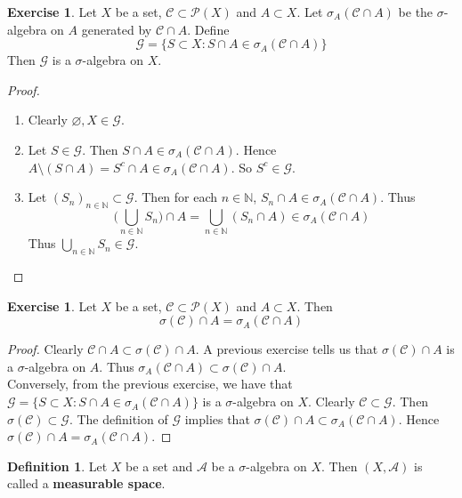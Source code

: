 \documentclass[12pt]{amsart}
\theoremstyle{definition}
\newtheorem{defn}[definition]{Definition}
\newtheorem{ex}[definition]{Exercise}
\newcommand{\sig}{\sigma}
\newcommand{\N}{\mathbb{N}}
\newcommand{\MA}{\mathcal{A}}
\newcommand{\MC}{\mathcal{C}}
\newcommand{\MG}{\mathcal{G}}
\newcommand{\MP}{\mathcal{P}}
\begin{document}
	\begin{ex}
		Let $X$ be a set, $\MC \subset \MP(X)$ and $A \subset X$. Let $\sig_A(\MC \cap A)$ be the $\sig$-algebra on $A$ generated by $\MC \cap A$. Define $$\MG = \{S \subset X: S \cap A \in \sig_A(\MC \cap A)\}$$ 
		Then $\MG$ is a $\sig$-algebra on $X$. 
	\end{ex}
	
	\begin{proof}
		\begin{enumerate}
			\item Clearly $\varnothing, X \in \MG$. 
			\item Let $S \in \MG$. Then $S \cap A \in \sig_A(\MC \cap A)$. Hence $A \setminus (S \cap A)  = S^c \cap A \in \sig_A(\MC \cap A)$. So $S^c \in \MG$. 
			\item Let $(S_n)_{n \in \N} \subset \MG$. Then for each $n \in \N$, $S_n \cap A \in \sig_A(\MC \cap A)$. Thus $$\bigg( \bigcup_{n \in \N} S_n \bigg) \cap A = \bigcup\limits_{n \in \N}(S_n \cap A) \in \sig_A(\MC \cap A)$$ Thus $\bigcup\limits_{n \in \N} S_n \in \MG$.
		\end{enumerate}
	\end{proof}
	
	\begin{ex}
		Let $X$ be a set, $\MC \subset \MP(X)$ and $A \subset X$. Then $$\sig(\MC) \cap A = \sig_A(\MC \cap A)$$
	\end{ex}
	
	\begin{proof}
		Clearly $\MC \cap A \subset \sig(\MC) \cap A$. A previous exercise tells us that $\sig(\MC) \cap A$ is a $\sig$-algebra on $A$. Thus $\sig_A(\MC \cap A) \subset \sig(\MC) \cap A$. \vspace{3mm}\\ Conversely, from the previous exercise, we have that $\MG = \{S \subset X: S \cap A \in \sig_A(\MC \cap A)\}$ is a $\sig$-algebra on $X$. Clearly $\MC \subset \MG$. Then $\sig(\MC) \subset \MG$. The definition of $\MG$ implies that $\sig(\MC) \cap A \subset \sig_A(\MC \cap A)$. Hence $\sig(\MC) \cap A = \sig_A(\MC \cap A)$.
	\end{proof}
	
	\begin{defn}
		Let $X$ be a set and $\MA$ be a $\sig$-algebra on $X$. Then $(X, \MA)$ is called a \textbf{measurable space}.
	\end{defn}
	
	
	
	
	
\end{document}
